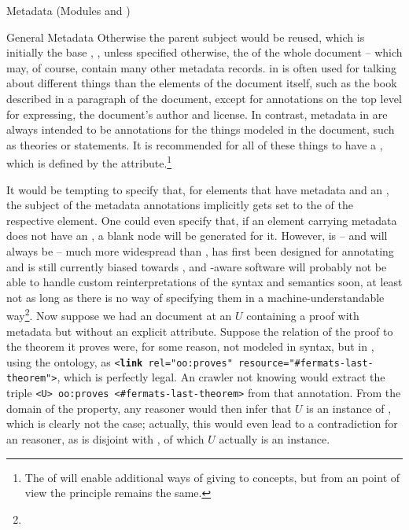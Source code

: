 \begin{tchapter}[id=metadata,short=Metadata]{Metadata (Modules {} and  {})}
\begin{tsection}{General Metadata}
Otherwise the parent subject would be reused, which is initially the
base \uri, \ie, unless specified otherwise, the \uri of the whole
document -- which may, of course, contain many other metadata records.
\rdfa in \xhtml is often used for talking about different things than
the elements of the \xhtml document itself, such as the book described
in a paragraph of the document, except for annotations on the top
level for expressing, \eg[,] the document's author and license.  In
contrast, metadata in \omdoc are always intended to be annotations for
the things modeled in the document, such as theories or statements.
It is recommended for all of these things to have a \uri, which is
defined by the  attribute.\footnote{The \mmt \uris
  of  will enable additional ways of giving \uris to
  \omdoc concepts, but from an \rdfa   point of view the principle
  remains the same.}

It would be tempting to specify that, for elements that have metadata
and an , the \rdfa subject of the metadata
annotations implicitly gets set to the \uri of the respective
element.  One could even specify
that, if an element carrying metadata does not have an
, a blank node will be generated for it. However,
\xhtml is -- and will always be -- much more widespread than \omdoc,
\rdfa has first been designed for annotating \xhtml and is still
currently biased towards \xhtml, and \rdfa-aware software will
probably not be able to handle custom reinterpretations of the \rdfa
syntax and semantics soon, at least not as long as there is no way of
specifying them in a machine-understandable way\footnote{}.  Now
suppose we had an \omdoc document at an \uri $U$ containing a proof
with \rdfa metadata but without an explicit 
attribute.  Suppose the relation of the proof to the theorem it proves
were, for some reason, not modeled in \omdoc syntax, but in \rdfa,
using the \omdoc ontology, \ie as \texttt{<\textbf{link}   rel="oo:proves" resource="\#fermats-last-theorem">}, which is perfectly legal.  An \rdfa crawler not knowing \omdoc would extract the triple \texttt{<U> oo:proves   <\#fermats-last-theorem>} from that annotation.  From the domain of the  property, any \rdfs reasoner would then infer that $U$ is an instance of , which is clearly not the case; actually, this would even lead to a contradiction for an \owl reasoner, as  is disjoint with , of which $U$ actually is an instance.


\end{tsection}
\end{tchapter}
